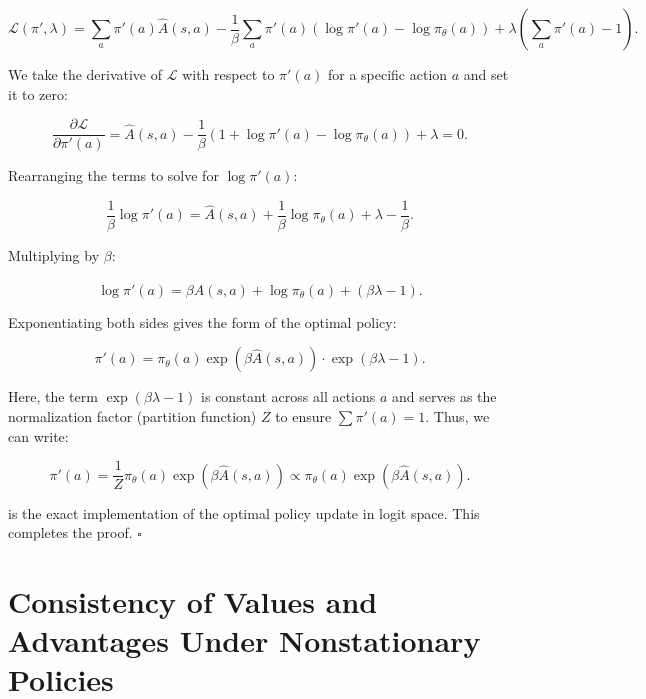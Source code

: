 \begin{equation}
    \mathcal{L}(\pi', \lambda) = \sum_{a} \pi'(a) \widehat A(s,a) - \frac{1}{\beta} \sum_{a} \pi'(a) (\log \pi'(a) - \log \pi_{\theta}(a)) + \lambda \left( \sum_{a} \pi'(a) - 1 \right).
\end{equation}

We take the derivative of $\mathcal{L}$ with respect to $\pi'(a)$ for a specific action $a$ and set it to zero:

\begin{equation}
    \frac{\partial \mathcal{L}}{\partial \pi'(a)} = \widehat A(s,a) - \frac{1}{\beta} (1 + \log \pi'(a) - \log \pi_{\theta}(a)) + \lambda = 0.
\end{equation}

Rearranging the terms to solve for $\log \pi'(a)$:

\begin{equation}
    \frac{1}{\beta} \log \pi'(a) = \widehat A(s,a) + \frac{1}{\beta} \log \pi_{\theta}(a) + \lambda - \frac{1}{\beta}.
\end{equation}

Multiplying by $\beta$:

\begin{equation}
    \log \pi'(a) = \beta \widehat A(s,a) + \log \pi_{\theta}(a) + (\beta \lambda - 1).
\end{equation}

Exponentiating both sides gives the form of the optimal policy:

\begin{equation}
    \pi'(a) = \pi_{\theta}(a) \exp(\beta \widehat A(s,a)) \cdot \exp(\beta \lambda - 1).
\end{equation}

Here, the term $\exp(\beta \lambda - 1)$ is constant across all actions $a$ and serves as the normalization factor (partition function) $Z$ to ensure $\sum \pi'(a) = 1$. Thus, we can write:

\begin{equation}
    \pi'(a) = \frac{1}{Z} \pi_{\theta}(a) \exp(\beta \widehat A(s,a)) \propto \pi_{\theta}(a) \exp(\beta \widehat A(s,a)).
    \label{eq:optimal_prob}
\end{equation}

is the exact implementation of the optimal policy update in logit space. This completes the proof. \hfill $\square$

\section{Consistency of Values and Advantages Under Nonstationary Policies}\label{app:consistency}

